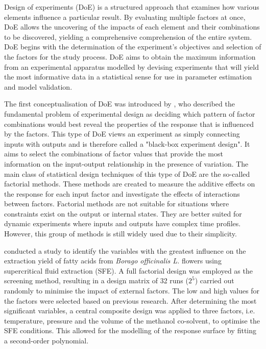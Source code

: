 \documentclass[a4paper,fleqn]{cas-dc}
\begin{document}
%
Design of experiments (DoE) is a structured approach that examines how various elements influence a particular result. By evaluating multiple factors at once, DoE allows the uncovering of the impacts of each element and their combinations to be discovered, yielding a comprehensive comprehension of the entire system. DoE begins with the determination of the experiment's objectives and selection of the factors for the study process. DoE aims to obtain the maximum information from an experimental apparatus modelled by devising experiments that will yield the most informative data in a statistical sense for use in parameter estimation and model validation. 

The first conceptualisation of DoE was introduced by \citet{Fisher1935}, who described the fundamental problem of experimental design as deciding which pattern of factor combinations would best reveal the properties of the response that is influenced by the factors. This type of DoE views an experiment as simply connecting inputs with outputs and is therefore called a "black-box experiment design". It aims to select the combinations of factor values that provide the most information on the input-output relationship in the presence of variation. The main class of statistical design techniques of this type of DoE are the so-called factorial methods. These methods are created to measure the additive effects on the response for each input factor and investigate the effects of interactions between factors. Factorial methods are not suitable for situations where constraints exist on the output or internal states. They are better suited for dynamic experiments where inputs and outputs have complex time profiles. However, this group of methods is still widely used due to their simplicity.

\citet{Ramandi2011} conducted a study to identify the variables with the greatest influence on the extraction yield of fatty acids from \textit{Borago officinalis L.} flowers using supercritical fluid extraction (SFE). A full factorial design was employed as the screening method, resulting in a design matrix of 32 runs ($2^5$) carried out randomly to minimise the impact of external factors. The low and high values for the factors were selected based on previous research. After determining the most significant variables, a central composite design was applied to three factors, i.e. temperature, pressure and the volume of the methanol co-solvent, to optimise the SFE conditions. This allowed for the modelling of the response surface by fitting a second-order polynomial.
\end{document}
